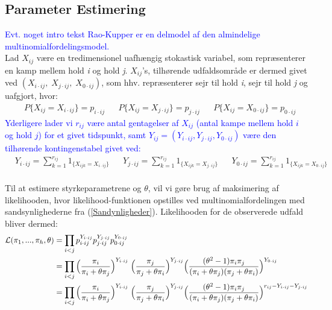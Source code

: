 \documentclass[11pt,a4paper]{article}
\begin{document}
\subsection{Parameter Estimering}
\textcolor{blue}{Evt. noget intro tekst}
\textcolor{blue}{Rao-Kupper er en delmodel af den almindelige multinomialfordelingsmodel.}\\
Lad $X_{ij}$ være en tredimensionel uafhængig stokastisk variabel, som repræsenterer en kamp mellem hold \textit{i} og hold \textit{j}. $X_{ij}$'s, tilhørende udfaldsområde er dermed givet ved $(X_{i\cdot ij},\;X_{j\cdot ij},\;X_{0\cdot ij})$, som hhv. repræsenterer sejr til hold \textit{i}, sejr til hold \textit{j} og uafgjort, hvor: 
\begin{align*}
   &P\{X_{ij}=X_{i\cdot ij}\}=p_{i\cdot ij} &&P\{X_{ij}=X_{j\cdot ij}\}=p_{j\cdot ij} &&P\{X_{ij}=X_{0\cdot ij}\}=p_{0\cdot ij}
\end{align*}
\textcolor{blue}{Yderligere lader vi $r_{ij}$ være antal gentagelser af $X_{ij}$ (antal kampe mellem hold $i$ og hold $j$) for et givet tidspunkt, samt $Y_{ij}=(Y_{i\cdot ij},Y_{j\cdot ij},Y_{0\cdot ij})$ være den tilhørende kontingenstabel givet ved:}\\
\begin{align*}
    &Y_{i\cdot ij}=\sum_{k=1}^{r_{ij}}1_{\{X_{ijk}=X_{i\cdot ij}\}} &&Y_{j\cdot ij}=\sum_{k=1}^{r_{ij}}1_{\{X_{ijk}=X_{j\cdot ij}\}} &&Y_{0\cdot ij}=\sum_{k=1}^{r_{ij}}1_{\{X_{ijk}=X_{0\cdot ij}\}}
\end{align*}
\\
Til at estimere styrkeparametrene og $\theta$, vil vi gøre brug af maksimering af likelihooden, hvor likelihood-funktionen opstilles ved multinomialfordelingen med sandsynlighederne fra (\ref{Sandynligheder}). Likelihooden for de observerede udfald bliver dermed:
\begin{align*}
\mathcal{L}(\pi_1,...,\pi_h,\theta) &= \prod_{i<j}p_{i\cdot ij}^{Y_{i\cdot ij}}p_{j\cdot ij}^{Y_{j\cdot ij}}p_{0\cdot ij}^{Y_{0\cdot ij}}\\
&= \prod_{i<j}\Big{(}\frac{\pi_i}{\pi_i+\theta\pi_j}\Big{)}^{Y_{i\cdot ij}}
\;\Big{(}\frac{\pi_j}{\pi_j+\theta\pi_i}\Big{)}^{Y_{j\cdot ij}}
\Big{(}\frac{(\theta^2-1)\pi_i \pi_j}{(\pi_i+\theta\pi_j)(\pi_j+\theta\pi_i)}\Big{)}^{Y_{0\cdot ij}}\\
&=\prod_{i<j}\Big{(}\frac{\pi_i}{\pi_i+\theta\pi_j}\Big{)}^{Y_{i\cdot ij}}
\;\Big{(}\frac{\pi_j}{\pi_j+\theta\pi_i}\Big{)}^{Y_{j\cdot ij}}
\Big{(}\frac{(\theta^2-1)\pi_i \pi_j}{(\pi_i+\theta\pi_j)(\pi_j+\theta\pi_i)}\Big{)}^{r_{ij}-{Y_{i\cdot ij}}-{Y_{j\cdot ij}}}\\
\end{align*}
\end{document}
